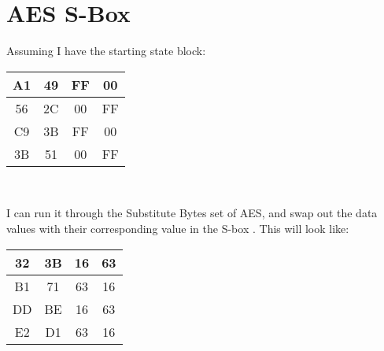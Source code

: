 \documentclass[14pt]{extarticle}
\begin{document}
\section{AES S-Box \cite{bblearn}}
Assuming I have the starting state block:\\
\begin{center}
  \begin{tabular}{|c|c|c|c|}
    \hline
    A1 & 49 & FF & 00\\
    \hline
    56 & 2C & 00 & FF\\
    \hline
    C9 & 3B & FF & 00\\
    \hline
    3B & 51 & 00 & FF\\
    \hline
  \end{tabular}\\
\end{center}
I can run it through the Substitute Bytes set of AES, and swap out the data values with their corresponding value in the S-box \cite[p.~649]{stallings}. This will look like:\\
\begin{center}
  \begin{tabular}{|c|c|c|c|}
    \hline
    32 & 3B & 16 & 63\\
    \hline
    B1 & 71 & 63 & 16\\
    \hline
    DD & BE & 16 & 63\\
    \hline
    E2 & D1 & 63 & 16\\
    \hline
  \end{tabular}\\
\end{center}
\end{document}
